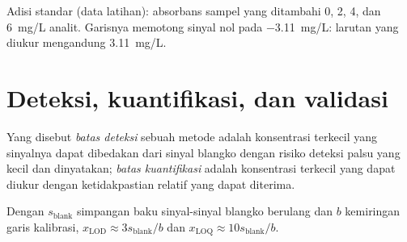 \begin{omfigure}

{\small Adisi standar (data latihan): absorbans sampel yang ditambahi 0, 2,
4, dan
\qty{6}{mg/L} analit. Garisnya memotong sinyal nol pada \qty{-3.11}{mg/L}:
larutan yang diukur mengandung \qty{3.11}{mg/L}.}
\end{omfigure}

\section{Deteksi, kuantifikasi, dan validasi}

\begin{definition}[Batas]\label{def:b2:measurement-statistics:limits}
Yang disebut \emph{batas deteksi} sebuah metode adalah
konsentrasi terkecil yang sinyalnya dapat dibedakan dari sinyal blangko
dengan risiko deteksi palsu yang kecil dan dinyatakan; \emph{batas
kuantifikasi} adalah konsentrasi terkecil yang
dapat diukur dengan ketidakpastian relatif yang dapat diterima.
\end{definition}

\begin{proposition}\label{prop:b2:measurement-statistics:lod}
Dengan $s_{\mathrm{blank}}$ simpangan baku sinyal-sinyal blangko berulang
dan $b$ kemiringan garis kalibrasi,
$x_{\mathrm{LOD}} \approx 3s_{\mathrm{blank}}/b$ dan $x_{\mathrm{LOQ}} \approx
10s_{\mathrm{blank}}/b$.
\end{proposition}

